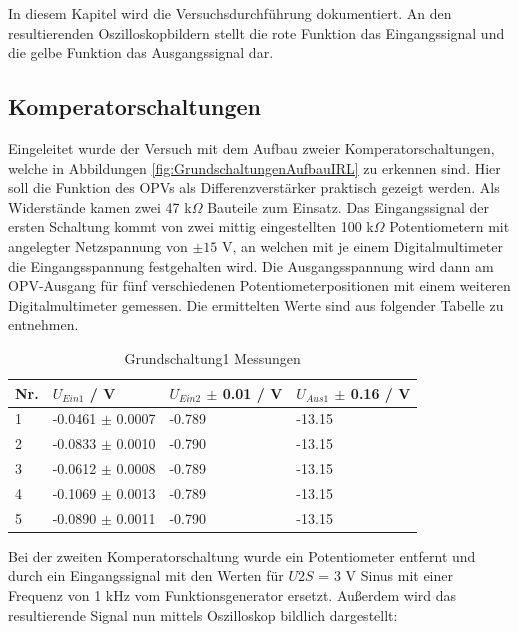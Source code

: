 \documentclass[12pt,a4paper,twoside]{article}
\begin{document}
In diesem Kapitel wird die Versuchsdurchführung dokumentiert. An den resultierenden Oszilloskopbildern stellt die rote Funktion das Eingangssignal und die gelbe Funktion das Ausgangssignal dar.

\subsection{Komperatorschaltungen}

Eingeleitet wurde der Versuch mit dem Aufbau zweier Komperatorschaltungen, welche in Abbildungen \ref{fig:GrundschaltungenAufbauIRL} zu erkennen sind. Hier soll die Funktion des OPVs als Differenzverstärker praktisch gezeigt werden.
Als Widerstände kamen zwei 47 k$\Omega$ Bauteile zum Einsatz. Das Eingangssignal der ersten Schaltung kommt von zwei mittig eingestellten 100 k$\Omega$ Potentiometern mit angelegter Netzspannung von $\pm 15 $ V, an welchen mit je einem Digitalmultimeter die Eingangsspannung festgehalten wird. Die Ausgangsspannung wird dann am OPV-Ausgang für fünf verschiedenen Potentiometerpositionen mit einem weiteren Digitalmultimeter gemessen. Die ermittelten Werte sind aus folgender Tabelle zu entnehmen.

\begin{table}[H]
    \centering
    \caption{Grundschaltung1 Messungen}
    \label{tab:Grundschaltung1Messungen}
    \begin{tabular}{| l | l | l | l |}
        \hline
        Nr. & $U_{Ein1}$ / V & $U_{Ein2}$ $\pm$ 0.01 / V & $U_{Aus1}$ $\pm$ 0.16 / V \\
        \hline
        1 & -0.0461 $\pm$ 0.0007 & -0.789 & -13.15 \\
        2 & -0.0833 $\pm$ 0.0010 & -0.790 & -13.15 \\
        3 & -0.0612 $\pm$ 0.0008 & -0.789 & -13.15 \\
        4 & -0.1069 $\pm$ 0.0013 & -0.789 & -13.15 \\
        5 & -0.0890 $\pm$ 0.0011 & -0.790 & -13.15 \\
        \hline
    \end{tabular}
\end{table}

\noindent
Bei der zweiten Komperatorschaltung wurde ein Potentiometer entfernt und durch ein Eingangssignal mit den Werten für $U{2S}$ = 3 V Sinus mit einer Frequenz von 1 kHz vom Funktionsgenerator ersetzt. Außerdem wird das resultierende Signal nun mittels Oszilloskop bildlich dargestellt:
\end{document}

